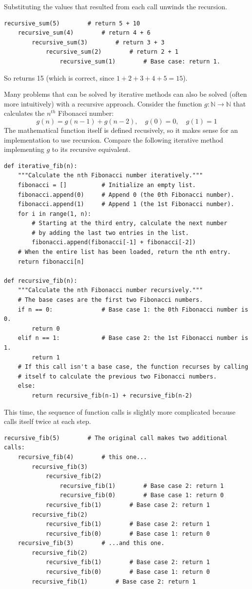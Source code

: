 Substituting the values that resulted from each call unwinds the recursion.

\begin{lstlisting}
recursive_sum(5)		# return 5 + 10
	recursive_sum(4)		# return 4 + 6
		recursive_sum(3)		# return 3 + 3
			recursive_sum(2)		# return 2 + 1
				recursive_sum(1)		# Base case: return 1.
\end{lstlisting}

So  returns 15 (which is correct, since $1 + 2 + 3 + 4 + 5 = 15$).

Many problems that can be solved by iterative methods can also be solved (often more intuitively) with a recursive approach.
Consider the function $g:\mathbb{N}\rightarrow\mathbb{N}$ that calculates the $n^{th}$ Fibonacci number:
\[g(n) = g(n-1) + g(n-2),\quad g(0)=0,\quad g(1)=1\]
The mathematical function itself is defined recusively, so it makes sense for an implementation to use recursion.
Compare the following iterative method implementing $g$ to its recursive equivalent.

\begin{lstlisting}
def iterative_fib(n):
	"""Calculate the nth Fibonacci number iteratively."""
	fibonacci = []          # Initialize an empty list.
	fibonacci.append(0)		# Append 0 (the 0th Fibonacci number).
	fibonacci.append(1)		# Append 1 (the 1st Fibonacci number).
	for i in range(1, n):
		# Starting at the third entry, calculate the next number
		# by adding the last two entries in the list.
		fibonacci.append(fibonacci[-1] + fibonacci[-2])
	# When the entire list has been loaded, return the nth entry.
	return fibonacci[n]

def recursive_fib(n):
	"""Calculate the nth Fibonacci number recursively."""
	# The base cases are the first two Fibonacci numbers.
	if n == 0:				# Base case 1: the 0th Fibonacci number is 0.
		return 0
	elif n == 1:			# Base case 2: the 1st Fibonacci number is 1.
		return 1
	# If this call isn't a base case, the function recurses by calling
	# itself to calculate the previous two Fibonacci numbers.
	else:
		return recursive_fib(n-1) + recursive_fib(n-2)
\end{lstlisting}

This time, the sequence of function calls is slightly more complicated because  calls itself twice at each step.

\begin{lstlisting}
recursive_fib(5)		# The original call makes two additional calls:
	recursive_fib(4)		# this one...
		recursive_fib(3)
			recursive_fib(2)
				recursive_fib(1)		# Base case 2: return 1
				recursive_fib(0)		# Base case 1: return 0
			recursive_fib(1)		# Base case 2: return 1
		recursive_fib(2)
			recursive_fib(1)		# Base case 2: return 1
			recursive_fib(0)		# Base case 1: return 0
	recursive_fib(3)		# ...and this one.
		recursive_fib(2)
			recursive_fib(1)		# Base case 2: return 1
			recursive_fib(0)		# Base case 1: return 0
		recursive_fib(1)		# Base case 2: return 1
\end{lstlisting}

